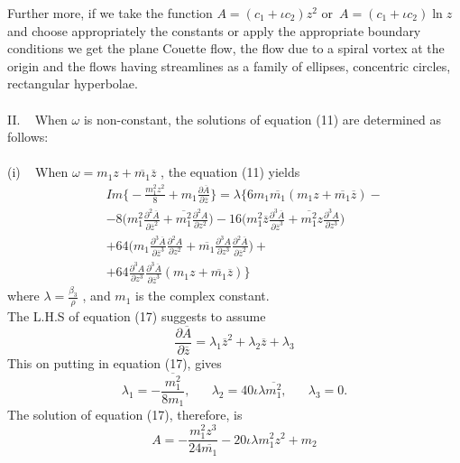 \documentclass[twocolumn,showpacs,preprintnumbers,amsmath,amssymb]{revtex4}
\newcommand{\bea}{\begin{eqnarray}}
\newcommand{\eea}{\end{eqnarray}}
\begin{document}
Further more, if we take the function $A=(c_{1}+\iota c_{2})z^{2}$
or\, $A=(c_{1}+\iota c_{2})\ln z$ and choose appropriately the
constants or apply the appropriate boundary conditions we get the
plane Couette flow, the flow due to a spiral vortex at the origin
and the flows having streamlines as a family of ellipses, concentric
circles, rectangular hyperbolae.\\\\
II.\,\,\,\,\, When $\omega$  is non-constant, the solutions of
equation (11) are determined as follows: \\\\
(i) \,\,\, When $\omega=m_{1}z+\overline{m_{1}}\overline{z}$  ,  the
equation (11) yields \bea\nonumber && Im\Big\{-\frac{m^{2}_1
z^{2}}{8}+m_{1}\frac{\partial \overline{A}}{\partial
\overline{z}}\Big\}=\lambda\Big\{6m_{1}\overline{m_{1}}(m_{1}z
+\overline{m_{1}}\overline{z})-\\&&\nonumber
-8\Big(m^{2}_1\frac{\partial^{2}\overline{A}}{\partial
\overline{z}^{2}}+\overline{m^{2}_1}\frac{\partial^{2}A}{\partial
z^{2}}\Big)
-16\Big(m^{2}_1\overline{z}\frac{\partial^{3}\overline{A}}{\partial
\overline{z}^{3}}+\overline{m^{2}_1}z\frac{\partial^{3}A}{\partial
z^{3}}\Big)\\&&\nonumber+64
\Big(m_{1}\frac{\partial^{3}\overline{A}}{\partial\overline{z}^{3}}
\frac{\partial^{2}A}{\partial
z^{2}}+\overline{m_{1}}\frac{\partial^{3}A}{\partial z^{3}}
\frac{\partial^{2}\overline{A}}{\partial\overline{z}^{2}}\Big)
+\\&&+64\frac{\partial^{3}A}{\partial z^{3}}
\frac{\partial^{3}\overline{A}}{\partial\overline{z}^{3}}(m_{1}z
+\overline{m_{1}}\overline{z})\Big\} \eea where
$\lambda=\frac{\beta_{3}}{\rho}$ , and $m_{1}$ is the complex
constant.\\ The L.H.S of equation (17) suggests to assume
\begin{equation}
\frac{\partial\overline{A}}{\partial\overline{z}}=\lambda_{1}\overline{z}^{2}
+\lambda_{2}\overline{z}+\lambda_{3}\nonumber
\end{equation}
This on putting in equation (17), gives
\begin{equation}
\lambda_{1}=-\frac{\overline{m^{2}_1}}{8m_{1}},\,\,\,\,\,\,
\,\,\,\,\lambda_{2}=40\iota\lambda \overline{m^{2}_1},
\,\,\,\,\,\,\,\,\,\,\lambda_{3}=0.\nonumber
\end{equation}
The solution of equation (17), therefore, is
\begin{equation}
A=-\frac{m^{2}_1 z^{3}}{24\overline{m_{1}}}-20\iota\lambda
m^{2}_1z^{2}+m_{2}
\end{equation}
\end{document}
